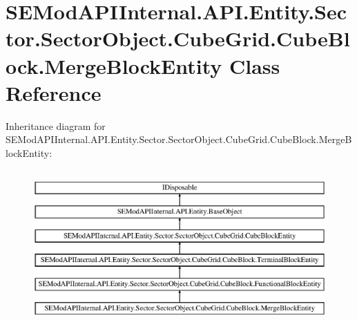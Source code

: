 \hypertarget{class_s_e_mod_a_p_i_internal_1_1_a_p_i_1_1_entity_1_1_sector_1_1_sector_object_1_1_cube_grid_1_15c3f321f9502c29c7df9fbd0ea065d76}{}\section{S\+E\+Mod\+A\+P\+I\+Internal.\+A\+P\+I.\+Entity.\+Sector.\+Sector\+Object.\+Cube\+Grid.\+Cube\+Block.\+Merge\+Block\+Entity Class Reference}
\label{class_s_e_mod_a_p_i_internal_1_1_a_p_i_1_1_entity_1_1_sector_1_1_sector_object_1_1_cube_grid_1_15c3f321f9502c29c7df9fbd0ea065d76}
Inheritance diagram for S\+E\+Mod\+A\+P\+I\+Internal.\+A\+P\+I.\+Entity.\+Sector.\+Sector\+Object.\+Cube\+Grid.\+Cube\+Block.\+Merge\+Block\+Entity\+:\begin{figure}[H]
\begin{center}
\leavevmode
\includegraphics[height=6.000000cm]{class_s_e_mod_a_p_i_internal_1_1_a_p_i_1_1_entity_1_1_sector_1_1_sector_object_1_1_cube_grid_1_15c3f321f9502c29c7df9fbd0ea065d76}
\end{center}
\end{figure}

